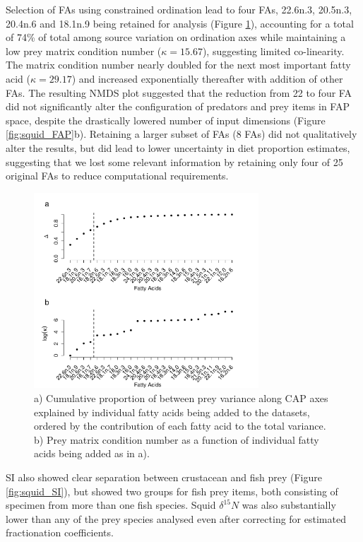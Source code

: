 \documentclass[fleqn,10pt]{wlpeerj}
\begin{document}
Selection of FAs using constrained ordination
lead to four FAs, 22.6n.3, 20.5n.3, 20.4n.6 and 18.1n.9 being
retained for analysis (Figure \ref{fig:var_select}), accounting for a
total of 74\% of total among source variation on ordination axes
while maintaining a low prey matrix condition number ($\kappa=15.67$),
suggesting limited co-linearity. The matrix condition number nearly
doubled for the next most important fatty acid ($\kappa=29.17$) and
increased exponentially thereafter with addition of other FAs. The
resulting NMDS plot suggested that the reduction from 22 to four FA did
not significantly alter the configuration of predators and prey items
in FAP space, despite the drastically lowered number of input
dimensions (Figure \ref{fig:squid_FAP}b). Retaining a larger subset of
FAs (8 FAs) did not qualitatively alter the results, but did lead to lower
uncertainty in diet proportion estimates, suggesting that we lost some
relevant information by retaining only four of 25 original FAs to
reduce computational requirements.

\begin{figure}
  \begin{center}  
      \includegraphics[width=0.75\textwidth]{figures/var_select.pdf}
      \caption{a) Cumulative proportion of between prey variance along CAP axes
      explained by individual fatty acids being added to the datasets,
      ordered by the contribution of each fatty acid to the total
      variance. b) Prey matrix condition number as a function of
      individual fatty acids being added as in a).}
    \label{fig:var_select}
  \end{center}
\end{figure}

SI also showed clear separation between crustacean and fish prey (Figure \ref{fig:squid_SI}),
but showed two groups for fish prey items, both consisting of specimen
from more than one fish species. Squid $\delta^{15}N$ was also substantially lower than any
of the prey species analysed even after correcting for estimated
fractionation coefficients.
\end{document}
